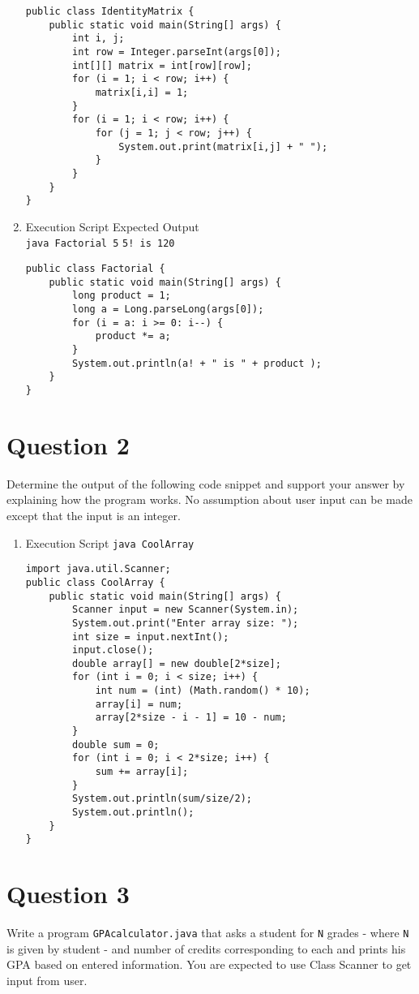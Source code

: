 \begin{enumerate}[label=\textbf{(\alph*)}]
\begin{lstlisting}
public class IdentityMatrix {
	public static void main(String[] args) {
		int i, j;
		int row = Integer.parseInt(args[0]);
		int[][] matrix = int[row][row];
		for (i = 1; i < row; i++) {
			matrix[i,i] = 1;
		}
		for (i = 1; i < row; i++) {
			for (j = 1; j < row; j++) {
				System.out.print(matrix[i,j] + " ");
			}
		}
	}
}
\end{lstlisting}
\newpage
\item Execution Script \hfill Expected Output\\
\texttt{java Factorial 5} \hfill \texttt{5! is 120}

\begin{lstlisting}
public class Factorial {
	public static void main(String[] args) {
		long product = 1;
		long a = Long.parseLong(args[0]);
		for (i = a: i >= 0: i--) {
			product *= a;
		}
		System.out.println(a! + " is " + product );
	}
}
\end{lstlisting}

\end{enumerate}

\section*{Question 2}
Determine the output of the following code snippet and support your answer by explaining how the program works. No assumption about user input can be made except that the input is an integer.

\begin{enumerate}[label=\textbf{(\alph*)}]
\item Execution Script \hfill \texttt{java CoolArray}

\begin{lstlisting}
import java.util.Scanner;
public class CoolArray {
	public static void main(String[] args) {
		Scanner input = new Scanner(System.in);
		System.out.print("Enter array size: ");
		int size = input.nextInt();
		input.close();
		double array[] = new double[2*size];
		for (int i = 0; i < size; i++) {
			int num = (int) (Math.random() * 10);
			array[i] = num;
			array[2*size - i - 1] = 10 - num;
		}
		double sum = 0;
		for (int i = 0; i < 2*size; i++) {
			sum += array[i];
		}
		System.out.println(sum/size/2);
		System.out.println();
	}
}

\end{lstlisting}

\end{enumerate}

\section*{Question 3}
Write a program \texttt{GPAcalculator.java} that asks a student for \texttt{N} grades - where \texttt{N} is given by student - and number of credits corresponding to each and prints his GPA based on entered information. You are expected to use Class Scanner to get input from user.
